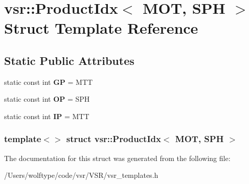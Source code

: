 \hypertarget{structvsr_1_1_product_idx_3_01_m_o_t_00_01_s_p_h_01_4}{\section{vsr\-:\-:Product\-Idx$<$ M\-O\-T, S\-P\-H $>$ Struct Template Reference}
\label{structvsr_1_1_product_idx_3_01_m_o_t_00_01_s_p_h_01_4}
}
\subsection*{Static Public Attributes}
\begin{DoxyCompactItemize}
\item 
\hypertarget{structvsr_1_1_product_idx_3_01_m_o_t_00_01_s_p_h_01_4_acfa7f7806ddc2df74d76f14e13bab9cf}{static const int {\bfseries G\-P} = M\-T\-T}\label{structvsr_1_1_product_idx_3_01_m_o_t_00_01_s_p_h_01_4_acfa7f7806ddc2df74d76f14e13bab9cf}

\item 
\hypertarget{structvsr_1_1_product_idx_3_01_m_o_t_00_01_s_p_h_01_4_ae9c14e219ec9876d2979862b6d460534}{static const int {\bfseries O\-P} = S\-P\-H}\label{structvsr_1_1_product_idx_3_01_m_o_t_00_01_s_p_h_01_4_ae9c14e219ec9876d2979862b6d460534}

\item 
\hypertarget{structvsr_1_1_product_idx_3_01_m_o_t_00_01_s_p_h_01_4_a39ec990102d08d01990a7d990b13bf56}{static const int {\bfseries I\-P} = M\-T\-T}\label{structvsr_1_1_product_idx_3_01_m_o_t_00_01_s_p_h_01_4_a39ec990102d08d01990a7d990b13bf56}

\end{DoxyCompactItemize}
\subsubsection*{template$<$$>$ struct vsr\-::\-Product\-Idx$<$ M\-O\-T, S\-P\-H $>$}



The documentation for this struct was generated from the following file\-:\begin{DoxyCompactItemize}
\item 
/\-Users/wolftype/code/vsr/\-V\-S\-R/vsr\-\_\-templates.\-h\end{DoxyCompactItemize}
